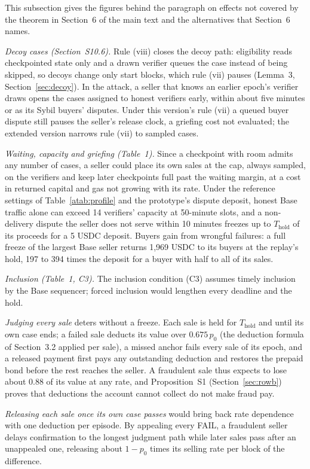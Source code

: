\documentclass[10pt,a4paper]{article}
\newcommand{\Thold}{T_{\mathrm{hold}}}
\theoremstyle{plain}
\theoremstyle{remark}
\begin{document}
This subsection gives the figures behind the paragraph on effects not covered by the theorem in Section~6 of the main text and the alternatives that Section~6 names.

\emph{Decoy cases (Section~S10.6).} Rule (viii) closes the decoy path: eligibility reads checkpointed state only and a drawn verifier queues the case instead of being skipped, so decoys change only start blocks, which rule (vii) pauses (Lemma~3, Section~\ref{sec:decoy}). In the attack, a seller that knows an earlier epoch's verifier draws opens the cases assigned to honest verifiers early, within about five minutes or as its Sybil buyers' disputes. Under this version's rule (vii) a queued buyer dispute still pauses the seller's release clock, a griefing cost not evaluated; the extended version narrows rule (vii) to sampled cases.

\emph{Waiting, capacity and griefing (Table~1).} Since a checkpoint with room admits any number of cases, a seller could place its own sales at the cap, always sampled, on the verifiers and keep later checkpoints full past the waiting margin, at a cost in returned capital and gas not growing with its rate. Under the reference settings of Table~\ref{atab:profile} and the prototype's dispute deposit, honest Base traffic alone can exceed 14 verifiers' capacity at 50-minute slots, and a non-delivery dispute the seller does not serve within 10 minutes freezes up to $\Thold$ of its proceeds for a 5 USDC deposit. Buyers gain from wrongful failures: a full freeze of the largest Base seller returns 1,969 USDC to its buyers at the replay's hold, 197 to 394 times the deposit for a buyer with half to all of its sales.

\emph{Inclusion (Table~1, C3).} The inclusion condition (C3) assumes timely inclusion by the Base sequencer; forced inclusion would lengthen every deadline and the hold.

\emph{Judging every sale} deters without a freeze. Each sale is held for $\Thold$ and until its own case ends; a failed sale deducts its value over $0.675\,p_0$ (the deduction formula of Section~3.2 applied per sale), a missed anchor fails every sale of its epoch, and a released payment first pays any outstanding deduction and restores the prepaid bond before the rest reaches the seller. A fraudulent sale thus expects to lose about 0.88 of its value at any rate, and Proposition~S1 (Section~\ref{sec:rowb}) proves that deductions the account cannot collect do not make fraud pay.

\emph{Releasing each sale once its own case passes} would bring back rate dependence with one deduction per episode. By appealing every FAIL, a fraudulent seller delays confirmation to the longest judgment path while later sales pass after an unappealed one, releasing about $1-p_0$ times its selling rate per block of the difference.
\end{document}
